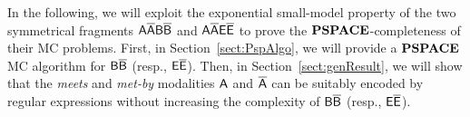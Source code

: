 In the following, we will exploit the exponential small-model property of the two symmetrical fragments $\mathsf{A\overline{A}B\overline{B}}$ and $\mathsf{A\overline{A}E\overline{E}}$ to prove the $\textbf{PSPACE}$-completeness of their MC problems.
First, in Section~\ref{sect:PspAlgo}, we will provide a $\textbf{PSPACE}$ MC algorithm for $\mathsf{B}\mathsf{\overline{B}}$ (resp., $\mathsf{E}\mathsf{\overline{E}}$). Then, in Section~\ref{sect:genResult}, we will show that the \emph{meets} and \emph{met-by} modalities $\mathsf{A}$ and $\mathsf{\overline{A}}$ can be suitably encoded by regular expressions without increasing the complexity of $\mathsf{B}\mathsf{\overline{B}}$ (resp., $\mathsf{E}\mathsf{\overline{E}}$).
